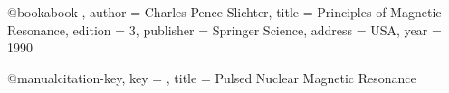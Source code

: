 @book{abook ,
author = {Charles Pence Slichter},
title = {Principles of Magnetic Resonance},
edition = {3},
publisher = {Springer Science},
address = {USA},
year = {1990}
}

@manual{citation-key,
    key = ,
    title = {Pulsed Nuclear Magnetic Resonance}
}
